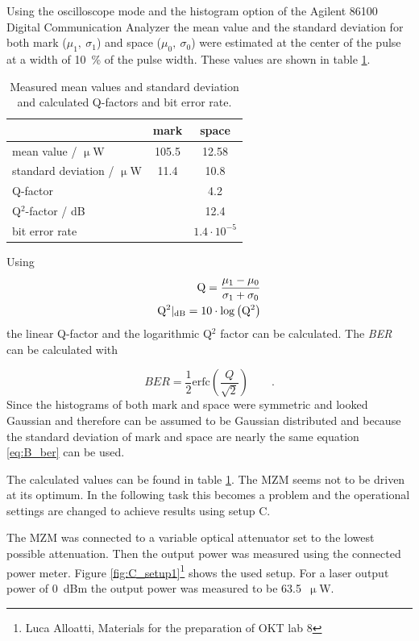 Using the oscilloscope mode and the histogram option of the Agilent 86100 Digital Communication Analyzer the mean value and the standard deviation for both mark ($\mu_1,~\sigma_1$) and space ($\mu_0,~\sigma_0$) were estimated at the center of the pulse at a width of 10~\% of the pulse width. These values are shown in table \ref{tab:B_Q}.

\begin{table}%
\centering
\caption{Measured mean values and standard deviation and calculated Q-factors and bit error rate.}
 
\begin{tabular}{lcc}
\toprule
&mark&space\\
\midrule
mean value / $\upmu$W&105.5	&12.58	\\
standard deviation / $\upmu$W&11.4	&10.8	\\\midrule
Q-factor&	&	4.2\\
Q$^2$-factor / dB	&	&12.4\\
bit error rate	&	&$1.4\cdot 10^{-5}$\\
\bottomrule 
\end{tabular}
\label{tab:B_Q}
\end{table}

Using 
\begin{equation}
\begin{split}
\mathrm{Q} = \frac{\mu_1-\mu_0}{\sigma_1+\sigma_0}\\
\mathrm{Q}^2|_{\mathrm{dB}} = 10\cdot \mathrm{log}\left(\mathrm{Q}^2\right)
\label{eq:}
\end{split}
\end{equation} 
the linear Q-factor and the logarithmic Q$^2$ factor can be calculated. The \textit{BER} can be calculated with

\begin{equation}
BER = \frac{1}{2}\mathrm{erfc}\left(\frac{Q}{\sqrt{2}}\right)\qquad.
\label{eq:B_ber}
\end{equation}
Since the histograms of both mark and space were symmetric and looked Gaussian and therefore can be assumed to be Gaussian distributed and because the standard deviation of mark and space are nearly the same equation \eqref{eq:B_ber} can be used.

The calculated values can be found in table \ref{tab:B_Q}. The MZM seems not to be driven at its optimum. In the following task this becomes a problem and the operational settings are changed to achieve results using setup C.

The MZM was connected to a variable optical attenuator set to the lowest possible attenuation. Then the output power was measured using the connected power meter. Figure \ref{fig:C_setup1}\footnote[3]{Luca Alloatti, Materials for the preparation of OKT lab 8} shows the used setup. For a laser output power of 0~dBm the output power was measured to be 63.5~$\upmu$W.

